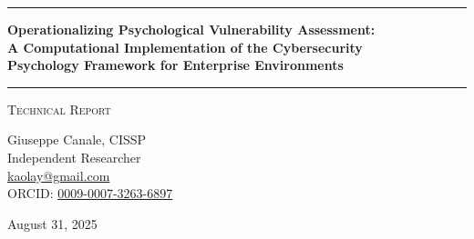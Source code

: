 \documentclass[11pt,a4paper]{article}
\begin{document}
\thispagestyle{empty}
\begin{center}

\vspace*{0.5cm}

\rule{\textwidth}{1.5pt}

\vspace{0.5cm}

{\LARGE \textbf{Operationalizing Psychological Vulnerability Assessment:}}\\[0.3cm]
{\LARGE \textbf{A Computational Implementation of the Cybersecurity}}\\[0.3cm]
{\LARGE \textbf{Psychology Framework for Enterprise Environments}}

\vspace{0.5cm}

\rule{\textwidth}{1.5pt}

\vspace{0.3cm}

{\large \textsc{Technical Report}}

\vspace{0.5cm}

{\Large Giuseppe Canale, CISSP}\\[0.2cm]
Independent Researcher\\[0.1cm]
\href{mailto:kaolay@gmail.com}{kaolay@gmail.com}\\[0.1cm]
ORCID: \href{https://orcid.org/0009-0007-3263-6897}{0009-0007-3263-6897}

\vspace{0.8cm}

{\large August 31, 2025}

\vspace{1cm}

\end{center}
\end{document}
